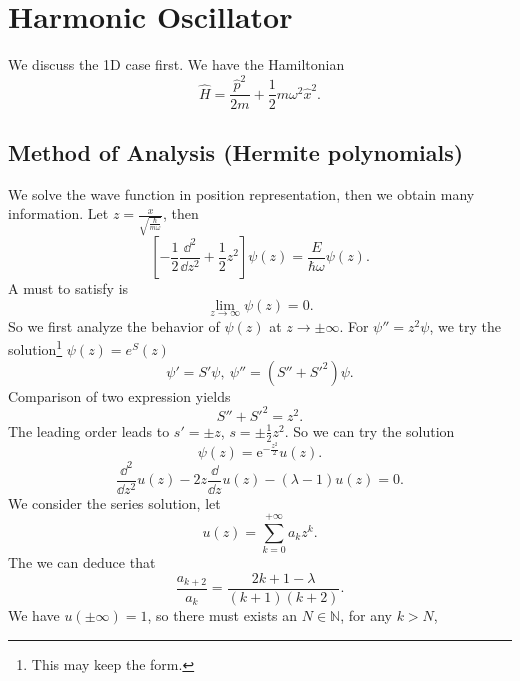 \documentclass{article}
\theoremstyle{1}
\newcommand{\ee}{\mathrm{e}}
\begin{document}
\section{Harmonic Oscillator}

We discuss the 1D case first. We have the Hamiltonian
\begin{equation}
    \hat{H}=\frac{\hat{p}^2}{2m}+\frac{1}{2}m\omega^2\hat{x}^2.
\end{equation}
\subsection{Method of Analysis (Hermite polynomials)}
We solve the wave function in position representation, then we obtain many information. Let $z=\frac{x}{\sqrt{\frac{\hbar}{m\omega}}}$, then 
\begin{equation}
    \left[-\frac{1}{2}\frac{\dd^2}{\dd{z}^2}+\frac{1}{2}z^2\right]\psi(z)=\frac{E}{\hbar \omega}\psi(z).
\end{equation}
A must to satisfy is 
\begin{equation}
    \lim_{z\rightarrow \infty}\psi(z)=0.   
\end{equation}
So we first analyze the behavior of $\psi(z)$ at $z\rightarrow \pm\infty$. For $\psi''=z^2\psi$, we try the solution\footnote{This may keep the form.} $\psi(z)=e^S(z)$
\begin{equation}
    \psi'=S'\psi,\ \psi''=\left(S''+S'^2\right)\psi.
\end{equation}
Comparison of two expression yields
\begin{equation}
    S''+S'^2=z^2.
\end{equation}
The leading order leads to $s'=\pm z$, $s=\pm\frac{1}{2}z^2$. So we can try the solution 
\begin{equation}
    \psi(z)=\ee^{-\frac{z^2}{2}} u(z).
\end{equation}
\begin{equation}\label{9.6}
    \frac{\dd^2}{\dd{z}^2}u(z)-2z\frac{\dd}{\dd{z}}u(z)-\left(\lambda-1\right)u(z)=0.
\end{equation}
We consider the series solution, let
\begin{equation}
    u(z)=\sum_{k=0}^{+\infty}a_kz^k.
\end{equation}
The we can deduce that 
\begin{equation}
    \frac{a_{k+2}}{a_k}=\frac{2k+1-\lambda}{(k+1)(k+2)}.
\end{equation}
We have $u(\pm\infty)=1$, so there must exists an $N\in \mathbb{N}$, for any $k>N$, 
\end{document}
